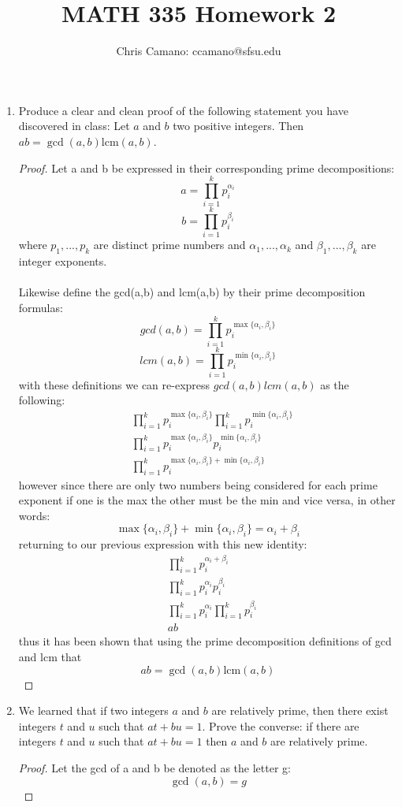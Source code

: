 \documentclass[11pt]{article}
\author{Chris Camano: ccamano@sfsu.edu}
\title{MATH 335  Homework 2 }
\date
\theoremstyle{definition}  %
\newcommand{\lcm}{\mathrm{lcm}}
\begin{document}
\maketitle

\begin{enumerate}
\item Produce a clear and clean proof of the following statement you have discovered in class:  Let $a$ and $b$ two positive integers. Then
$ab = \gcd(a,b) \lcm(a,b)$.
\begin{proof}
    Let a and b be expressed in their corresponding prime decompositions:
    \[
      a=\prod_{i=1}^kp_i^{\alpha_i}
    \]
    \[
      b=\prod_{i=1}^kp_i^{\beta_i}
    \]
    where $p_1,...,p_k$ are distinct prime numbers and $\alpha_1,...,\alpha_k$ and $\beta_1,...,\beta_k$ are integer exponents. \\\\
    Likewise define the gcd(a,b) and lcm(a,b) by their prime decomposition formulas:
    \[
      gcd(a,b)=\prod_{i=1}^kp_i^{\max\{\alpha_i,\beta_i\}}
    \]
    \[
      lcm(a,b)=\prod_{i=1}^kp_i^{\min\{\alpha_i,\beta_i\}}
    \]
    with these definitions we can re-express $gcd(a,b)lcm(a,b)$ as the following:
    \begin{align*}
      &\prod_{i=1}^kp_i^{\max\{\alpha_i,\beta_i\}}\prod_{i=1}^kp_i^{\min\{\alpha_i,\beta_i\}}\\
      &\prod_{i=1}^kp_i^{\max\{\alpha_i,\beta_i\}}p_i^{\min\{\alpha_i,\beta_i\}}\\
      &\prod_{i=1}^kp_i^{\max\{\alpha_i,\beta_i\}+{\min\{\alpha_i,\beta_i\}}}
    \end{align*}
    however since there are only two numbers being considered for each prime exponent if one is the max the other must be the min and vice versa, in other words:
    \[
      \max\{\alpha_i,\beta_i\}+\min\{\alpha_i,\beta_i\}=\alpha_i+\beta_i
    \]
    returning to our previous expression with this new identity:
    \begin{align*}
      &\prod_{i=1}^kp_i^{\alpha_i+\beta_i}\\
      &\prod_{i=1}^kp_i^{\alpha_i}p_i^{\beta_i}\\
      &\prod_{i=1}^kp_i^{\alpha_i}\prod_{i=1}^kp_i^{\beta_i}\\
      &ab
    \end{align*}
    thus it has been shown that using the prime decomposition definitions of gcd and lcm that
    \[
      ab = \gcd(a,b) \lcm(a,b)
    \]
\end{proof}
\item We learned that if two integers $a$ and $b$ are relatively prime, then there exist integers $t$ and $u$ such that $at + bu = 1$.
Prove the converse: if there are integers $t$ and $u$ such that $at + bu = 1$ then $a$ and $b$ are relatively prime.
\begin{proof}
Let the gcd of a and b be denoted as the letter g:
\[
  \gcd(a,b)=g
\]


\end{proof}
\end{enumerate}
\end{document}
